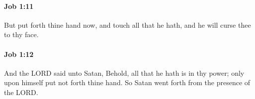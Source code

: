 		\paragraph{Job 1:11} %
			\label{JOB-1-11}

			But put forth thine hand now, and touch all that he hath, and he will curse thee to thy face.


		\paragraph{Job 1:12} %
			\label{JOB-1-12}

			And the LORD said unto Satan, Behold, all that he hath is in thy power; only upon himself put not forth thine hand. So Satan went forth from the presence of the LORD.


